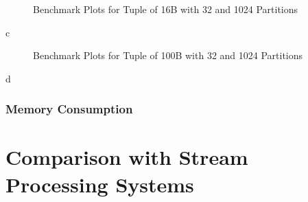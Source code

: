\begin{figure}[h]
  \centering
  \begin{subfigure}{.49\textwidth}
    \centering
    \resizebox{\linewidth}{!}{}
  \end{subfigure}
  \begin{subfigure}{.49\textwidth}
    \centering
    \resizebox{\linewidth}{!}{}
  \end{subfigure}
  \caption[Shuffle Benchmark Plots for Tuple of 16B with 32 and 1024 Partitions]{Benchmark Plots for Tuple of 16B with 32 and 1024 Partitions}
  \label{plot-shuffle-16B-32-1024}
\end{figure}

c

\begin{figure}[h]
  \centering
  \begin{subfigure}{.49\textwidth}
    \centering
    \resizebox{\linewidth}{!}{}
  \end{subfigure}
  \begin{subfigure}{.49\textwidth}
    \centering
    \resizebox{\linewidth}{!}{}
  \end{subfigure}
  \caption[Shuffle Benchmark Plots for Tuple of 100B with 32 and 1024 Partitions]{Benchmark Plots for Tuple of 100B with 32 and 1024 Partitions}
  \label{plot-shuffle-100B-32-1024}
\end{figure}
d

\subsubsection{Memory Consumption}

\section{Comparison with Stream Processing Systems}
